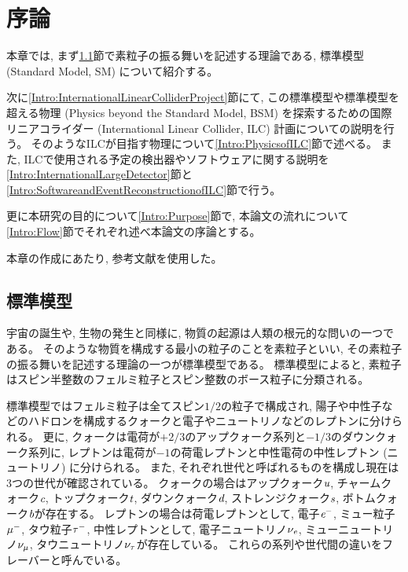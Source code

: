 
\chapter{序論} \label{chap:Introduction}

本章では, まず\ref{Intro:StandardModel}節で素粒子の振る舞いを記述する理論である, 標準模型 (Standard Model, SM) について紹介する。

次に\ref{Intro:InternationalLinearColliderProject}節にて, この標準模型や標準模型を超える物理 (Physics beyond the Standard Model, BSM) を探索するための国際リニアコライダー (International Linear Collider, ILC) 計画についての説明を行う。
そのようなILCが目指す物理について\ref{Intro:PhysicsofILC}節で述べる。
また, ILCで使用される予定の検出器やソフトウェアに関する説明を\ref{Intro:InternationalLargeDetector}節と\ref{Intro:SoftwareandEventReconstructionofILC}節で行う。

更に本研究の目的について\ref{Intro:Purpose}節で, 本論文の流れについて\ref{Intro:Flow}節でそれぞれ述べ本論文の序論とする。

本章の作成にあたり, 参考文献\cite{GlobalProject, InterimDesignReport}を使用した。


\section{標準模型} \label{Intro:StandardModel}

宇宙の誕生や, 生物の発生と同様に, 物質の起源は人類の根元的な問いの一つである。
そのような物質を構成する最小の粒子のことを素粒子といい, その素粒子の振る舞いを記述する理論の一つが標準模型である。
標準模型によると, 素粒子はスピン半整数のフェルミ粒子とスピン整数のボース粒子に分類される。

標準模型ではフェルミ粒子は全てスピン$1/2$の粒子で構成され, 陽子や中性子などのハドロンを構成するクォークと電子やニュートリノなどのレプトンに分けられる。
更に, クォークは電荷が$+2/3$のアップクォーク系列と$-1/3$のダウンクォーク系列に, レプトンは電荷が$-1$の荷電レプトンと中性電荷の中性レプトン (ニュートリノ) に分けられる。
また, それぞれ世代と呼ばれるものを構成し現在は3つの世代が確認されている。
クォークの場合はアップクォーク$\textit u$, チャームクォーク$\textit c$, トップクォーク$\textit t$, ダウンクォーク$\textit d$, ストレンジクォーク$\textit s$, ボトムクォーク$\textit b$が存在する。
レプトンの場合は荷電レプトンとして, 電子$\textit e^-$, ミュー粒子$\it \mu^-$, タウ粒子$\it \tau^-$, 中性レプトンとして, 電子ニュートリノ$\it \nu_e$, ミューニュートリノ$\it \nu_{\mu}$, タウニュートリノ$\it \nu_{\tau}$が存在している。
これらの系列や世代間の違いをフレーバーと呼んでいる。

